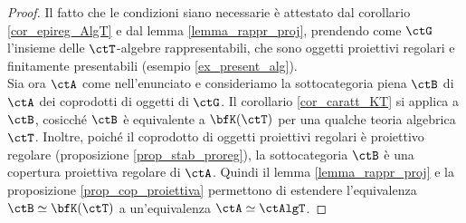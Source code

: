 \begin{proof}
 Il fatto che le condizioni siano necessarie è attestato dal corollario \ref{cor_epireg_AlgT} e dal lemma \ref{lemma_rappr_proj},
 prendendo come \(\ctG\) l'insieme delle \(\ctT\)-algebre rappresentabili, che sono oggetti proiettivi regolari e finitamente presentabili
 (esempio \ref{ex_present_alg}). \\
 Sia ora \(\ctA\) come nell'enunciato e consideriamo la sottocategoria piena \(\ctB\) di \(\ctA\) dei coprodotti di oggetti di \(\ctG\).
 Il corollario \ref{cor_caratt_KT} si applica a \(\ctB\), cosicché \(\ctB\) è equivalente a \(\bfK(\ctT)\) per una qualche teoria algebrica
 \(\ctT\). Inoltre, poiché il coprodotto di oggetti proiettivi regolari è proiettivo regolare (proposizione \ref{prop_stab_proreg}), la
 sottocategoria \(\ctB\) è una copertura proiettiva regolare di \(\ctA\). Quindi il lemma \ref{lemma_rappr_proj} e la proposizione
 \ref{prop_cop_proiettiva} permettono di estendere l'equivalenza \(\ctB \simeq \bfK(\ctT)\) a un'equivalenza \(\ctA \simeq \ctAlgT\).
\end{proof}

